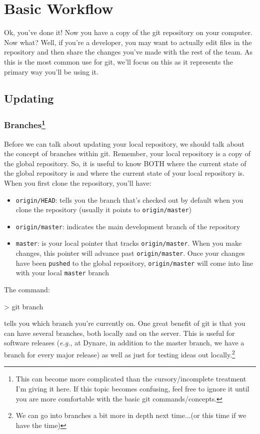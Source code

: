 \documentclass[10pt,letterpaper]{article}
\begin{document}
\section{Basic Workflow}

Ok, you've done it! Now you have a copy of the git repository on your computer. Now what? Well, if you're a developer, you may want to actually edit files in the repository and then share the changes you've made with the rest of the team. As this is the most common use for git, we'll focus on this as it represents the primary way you'll be using it.

\subsection{Updating}

\subsubsection[Branches]{Branches\footnote{This can become more complicated than the cursory/incomplete treatment I'm giving it here. If this topic becomes confusing, feel free to ignore it until you are more comfortable with the basic git commands/concepts.}}

Before we can talk about updating your local repository, we should talk about the concept of branches within git. Remember, your local repository is a copy of the global repository. So, it is useful to know BOTH where the current state of the global repository is and where the current state of your local repository is. When you first clone the repository, you'll have:

\begin{itemize}
\item \texttt{origin/HEAD}: tells you the branch that's checked out by default when you clone the repository (usually it points to \texttt{origin/master})
\item \texttt{origin/master}: indicates the main development branch of the repository
\item \texttt{master}: is your local pointer that tracks \texttt{origin/master}. When you make changes, this pointer will advance past \texttt{origin/master}. Once your changes have been \texttt{pushed} to the global repository, \texttt{origin/master} will come into line with your local \texttt{master} branch
\end{itemize}

\noindent The command:
\begin{code}
> git branch
\end{code}
\noindent tells you which branch you're currently on. One great benefit of git is that you can have several branches, both locally and on the server. This is useful for software releases (\textit{e.g.}, at Dynare, in addition to the master branch, we have a branch for every major release) as well as just for testing ideas out locally.\footnote{We can go into branches a bit more in depth next time...(or this time if we have the time)}
\end{document}
